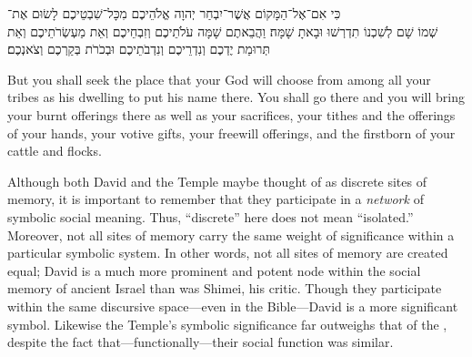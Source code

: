 \begin{hebrewtext}
    כִּי אִם־אֶל־הַמָּקוֹם אֲשֶׁר־יִבְחַר יְהוָה אֱלֹהֵיכֶם מִכָּל־שִׁבְטֵיכֶם לָשׂוּם אֶת־\\שְׁמוֹ שָׁם לְשִׁכְנוֹ תִדְרְשׁוּ וּבָאתָ שָׁמָּה׃
    וַהֲבֵאתֶם שָׁמָּה עֹלֹתֵיכֶם וְזִבְחֵיכֶם וְאֵת מַעְשְׂרֹתֵיכֶם וְאֵת תְּרוּמַת יֶדְכֶם וְנִדְרֵיכֶם וְנִדְבֹתֵיכֶם וּבְכֹרֹת בְּקַרְכֶם וְצֹאנְכֶם׃
\end{hebrewtext}
\begin{translation}
    But you shall seek the place that \yahweh your God will choose from among all your tribes as his dwelling to put his name there. You shall go there
    and you will bring your burnt offerings there as well as your sacrifices, your tithes and the offerings of your hands, your votive gifts, your freewill offerings, and the firstborn of your cattle and flocks. 
\end{translation}















Although both David and the Temple maybe thought of as discrete sites of memory, it is important to remember that they participate in a \emph{network} of symbolic social meaning. Thus, ``discrete'' here does not mean ``isolated.'' Moreover, not all sites of memory carry the same weight of significance within a particular symbolic system. In other words, not all sites of memory are created equal; David is a much more prominent and potent node within the social memory of ancient Israel than was Shimei, his critic. Though they participate within the same discursive space---even in the Bible---David is a more significant symbol. Likewise the Temple's symbolic significance far outweighs that of the , despite the fact that---functionally---their social function was similar.

